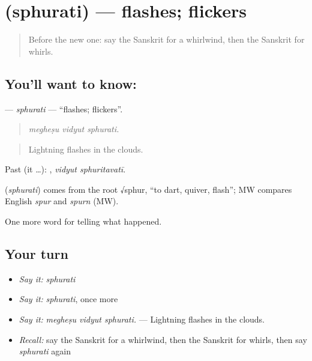\section[\texorpdfstring{\sk{स्फुरति} (sphurati)}{स्फुरति (sphurati)}]{ (sphurati) — flashes; flickers}

\label{lesson:SA-C301-sphurati}



\begin{quote}
Before the new one: say the Sanskrit for a whirlwind, then the Sanskrit for whirls.
\end{quote}

\subsection*{You'll want to know: }
\textbf{} — \emph{sphurati} — \textquotedblleft{}flashes; flickers\textquotedblright{}.

\begin{quote}
  
\end{quote}

\begin{quote}
\emph{megheṣu vidyut sphurati.}
\end{quote}

\begin{quote}
Lightning flashes in the clouds.
\end{quote}

Past (it …):  , \emph{vidyut sphuritavatī}.

\begin{cousinweb}
\textbf{} (\emph{sphurati}) comes from the root √sphur, \textquotedblleft{}to dart, quiver, flash\textquotedblright{}; MW compares English \emph{spur} and \emph{spurn} (MW).
\end{cousinweb}

\begin{grammarlens}[title={What you've built}]
One more word for telling what happened.
\end{grammarlens}

\subsection*{Your turn}
\begin{itemize}
\raggedright
  \item \emph{Say it:} \emph{sphurati}
  \item \emph{Say it:} \emph{sphurati}, once more
  \item \emph{Say it:} \emph{megheṣu vidyut sphurati.} — Lightning flashes in the clouds.
  \item \emph{Recall:} say the Sanskrit for a whirlwind, then the Sanskrit for whirls, then say \emph{sphurati} again
\end{itemize}

